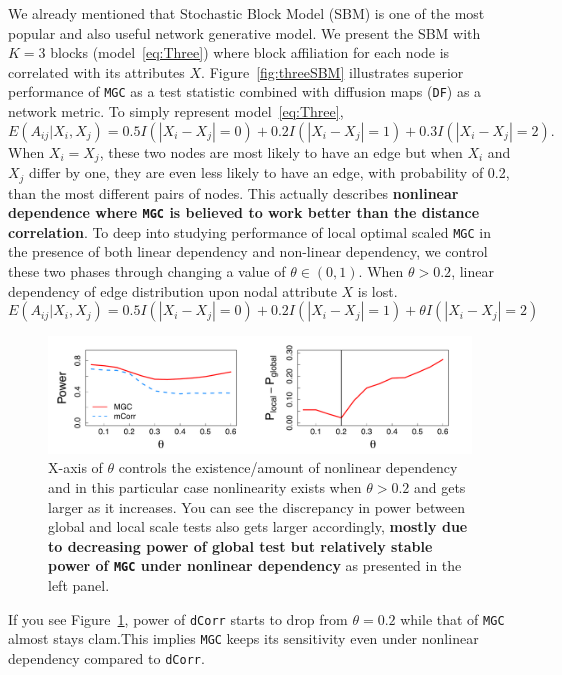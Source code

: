 \documentclass[12pt]{article}
\theoremstyle{definition}
\begin{document}
We already mentioned that Stochastic Block Model (SBM) is one of the most popular and also useful network generative model. We present the SBM with $K=3$ blocks (model~\ref{eq:Three}) where block affiliation for each node is correlated with its attributes $X$. Figure~\ref{fig:threeSBM} illustrates superior performance of \texttt{MGC} as a test statistic combined with diffusion maps (\texttt{DF}) as a network metric. To simply represent model~\ref{eq:Three},
\begin{equation}
E(A_{ij} | X_{i}, X_{j}) = 0.5 I(|X_{i} - X_{j}| = 0) + 0.2 I(|X_{i} - X_{j}| = 1) + 0.3 I(|X_{i} - X_{j}| = 2).
\end{equation}
When $X_{i} = X_{j}$, these two nodes are most likely to have an edge but when $X_{i}$ and  $X_{j}$ differ by one, they are even less likely to have an edge, with probability of 0.2, than the most different pairs of nodes. This actually describes \textbf{nonlinear dependence where \texttt{MGC} is believed to work better than the distance correlation}. To deep into studying performance of local optimal scaled \texttt{MGC} in the presence of both linear dependency and non-linear dependency, we control these two phases through changing a value of $\theta \in (0, 1)$. When $\theta > 0.2$, linear dependency of edge distribution upon nodal attribute $X$ is lost.
\begin{equation}
E(A_{ij} | X_{i}, X_{j}) = 0.5 I(|X_{i} - X_{j}| = 0) + 0.2 I(|X_{i} - X_{j}| = 1) + \theta I(|X_{i} - X_{j}| = 2)
\end{equation}
\begin{figure}[h]
	\centering
	\includegraphics[width=\linewidth]{../Figure/powerplot_simple.pdf}
	\caption{X-axis of $\theta$ controls the existence/amount of nonlinear dependency and in this particular case nonlinearity exists when $\theta > 0.2$ and gets larger as it increases. You can see the discrepancy in power between global and local scale tests also gets larger accordingly, \textbf{mostly due to decreasing power of global test but relatively stable power of \texttt{MGC} under nonlinear dependency} as presented in the left panel.}
	\label{fig:powerplot}
\end{figure}
If you see Figure~\ref{fig:powerplot}, power of \texttt{dCorr} starts to drop from $\theta = 0.2$ while that of \texttt{MGC} almost stays clam.This implies \texttt{MGC} keeps its sensitivity even under nonlinear dependency compared to \texttt{dCorr}.
\end{document}
